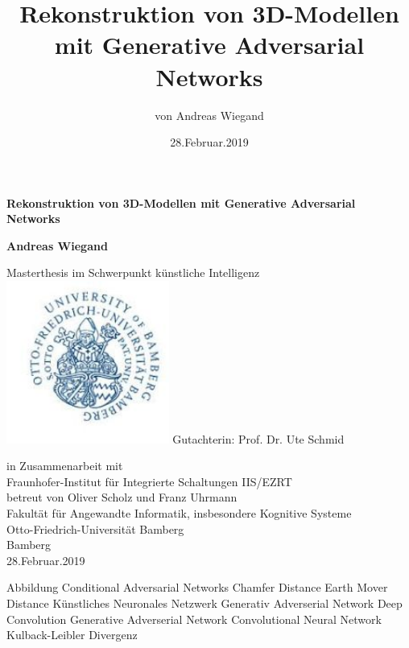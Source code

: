 \documentclass{llncs}
\begin{document}
\begin{titlepage}
	\begin{center}
		\vspace{3cm}
		
		\textbf{\huge Rekonstruktion von 3D-Modellen mit Generative Adversarial Networks}

				
		\vspace{1.5cm}
		
		\textbf{Andreas Wiegand}
		
		
		
		Masterthesis im Schwerpunkt künstliche Intelligenz \\
		\vspace{1.5cm}
		\includegraphics[width=0.4\textwidth]{bamberg_logo.png}
		\vspace{1.5cm}
		Gutachterin: Prof. Dr. Ute Schmid

		\vspace{1.5cm}
		in Zusammenarbeit mit\\
		Fraunhofer-Institut für Integrierte Schaltungen IIS/EZRT\\
		betreut von Oliver Scholz und Franz Uhrmann\\
		\vspace{0.8cm}
		Fakultät für Angewandte Informatik, insbesondere Kognitive Systeme\\
		Otto-Friedrich-Universität Bamberg\\
		Bamberg\\
		28.Februar.2019
		
	\end{center}
\end{titlepage}
\tableofcontents
\newpage
\begin{acronym}[Bash]
	 Abbildung
	Conditional Adversarial Networks
	 Chamfer Distance
	 Earth Mover Distance
	 Künstliches Neuronales Netzwerk
	 Generativ Adverserial Network
	Deep Convolution Generative Adverserial Network
	 Convolutional Neural Network
	 Kulback-Leibler Divergenz
\end{acronym}
\title{Rekonstruktion von 3D-Modellen mit Generative Adversarial Networks}
\author{von Andreas Wiegand}
\date{28.Februar.2019}
\maketitle
\end{document}
